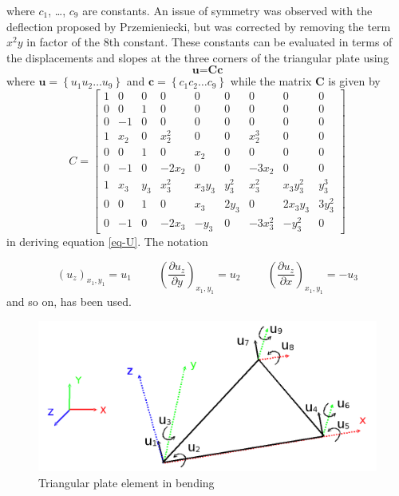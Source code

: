 \documentclass{llncs}
\begin{document}
where $c_1$, \ldots , $c_9$ are constants. An issue of symmetry was observed with the deflection proposed by Przemieniecki, but was corrected by removing the term $x^2y$ in factor of the 8th constant. These constants can be evaluated in terms of the displacements and slopes at the three corners of the triangular plate using 
\begin{equation}
\textbf{u} = \textbf{Cc}
\label{eq-U}
\end{equation} 
where $\textbf{u} = \left\{u_1 u_2 \ldots u_9 \right\} $ and $\textbf{c} = \left\{c_1 c_2 \ldots c_9 \right\} $ while the matrix $\textbf{C}$ is given by
\begin{equation}
C = 
	\begin{bmatrix}
	1 & 0 & 0 & 0 & 0 & 0 & 0 & 0 & 0 \\
 	0 & 0 & 1 & 0 & 0 & 0 & 0 & 0 & 0 \\
	0 & -1 & 0 & 0 & 0 & 0 & 0 & 0 & 0 \\
	1 & x_2 & 0 & x_2^2 & 0 & 0 & x_2^3 & 0 & 0 \\
	0 & 0 & 1 & 0 & x_2 & 0 & 0 & 0 & 0 \\
	0 & -1 & 0 & -2x_2 & 0 & 0 & -3x_2 & 0 & 0 \\
	1 & x_3 & y_3 & x_3^2 & x_3y_3 & y_3^2 & x_3^2 & x_3y_3^2& y_3^3 \\
	0 & 0 & 1 & 0 & x_3 & 2y_3 & 0 & 2x_3y_3 & 3y_3^2 \\
	0 & -1 & 0 & -2x_3 & -y_3 & 0 & -3x_3^2 & -y_3^2 & 0
	\end{bmatrix}
\end{equation} 
in deriving equation \ref{eq-U}. The notation 

\begin{equation}
(u_z)_{x_1,y_1} = u_1 \hspace{1cm} \left(\frac{\partial u_z}{\partial y}\right)_{x_1,y_1} = u_2 \hspace{1cm} \left(\frac{\partial u_z}{\partial x}\right)_{x_1,y_1} = -u_3
\end{equation} 
and so on, has been used.

\begin{figure}
\begin{center}
\includegraphics[width=12cm]{images/triangle}
\caption {Triangular plate element in bending}
\label{fig-triangle}
\end{center}
\end{figure}
\end{document}
